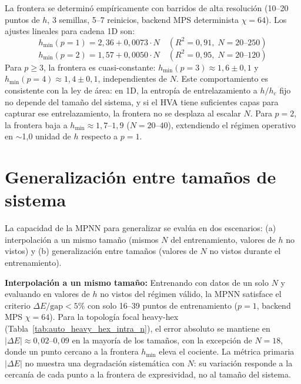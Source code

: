\documentclass[11pt,a4paper,spanish]{book}
\begin{document}
La frontera se determinó empíricamente con barridos de alta resolución (10--20 puntos de $h$, 3 semillas, 5--7 reinicios, backend MPS determinista $\chi = 64$). Los ajustes lineales para cadena 1D son:
\begin{equation}
h_{\min}(p{=}1) = 2,36 + 0,0073 \cdot N \quad (R^2 = 0,91, \; N = 20\text{--}250)
\label{eq:frontier_p1}
\end{equation}
\begin{equation}
h_{\min}(p{=}2) = 1,57 + 0,0050 \cdot N \quad (R^2 = 0,95, \; N = 20\text{--}120)
\label{eq:frontier_p2}
\end{equation}
Para $p \geq 3$, la frontera es cuasi-constante: $h_{\min}(p{=}3) \approx 1,6 \pm 0,1$ y $h_{\min}(p{=}4) \approx 1,4 \pm 0,1$, independientes de $N$. Este comportamiento es consistente con la ley de área: en 1D, la entropía de entrelazamiento a $h/h_c$ fijo no depende del tamaño del sistema, y si el HVA tiene suficientes capas para capturar ese entrelazamiento, la frontera no se desplaza al escalar $N$. Para $p = 2$, la frontera baja a $h_{\min} \approx 1,7$--$1,9$ ($N = 20$--$40$), extendiendo el régimen operativo en $\sim$1,0 unidad de $h$ respecto a $p = 1$.


\section{Generalización entre tamaños de sistema}
\label{sec:generalizacion_n}

La capacidad de la MPNN para generalizar se evalúa en dos escenarios: (a) interpolación a un mismo tamaño (mismos $N$ del entrenamiento, valores de $h$ no vistos) y (b) generalización entre tamaños (valores de $N$ no vistos durante el entrenamiento).

\textbf{Interpolación a un mismo tamaño:} Entrenando con datos de un solo $N$ y evaluando en valores de $h$ no vistos del régimen válido, la MPNN satisface el criterio $\Delta E/\text{gap} < 5\%$ con solo 16--39 puntos de entrenamiento ($p = 1$, backend MPS $\chi = 64$). Para la topología focal heavy-hex (Tabla~\ref{tab:auto_heavy_hex_intra_n}), el error absoluto se mantiene en $|\Delta E| \approx 0,02$--$0,09$ en la mayoría de los tamaños, con la excepción de $N = 18$, donde un punto cercano a la frontera $h_{\min}$ eleva el cociente. La métrica primaria $|\Delta E|$ no muestra una degradación sistemática con $N$: su variación responde a la cercanía de cada punto a la frontera de expresividad, no al tamaño del sistema.


\end{document}
